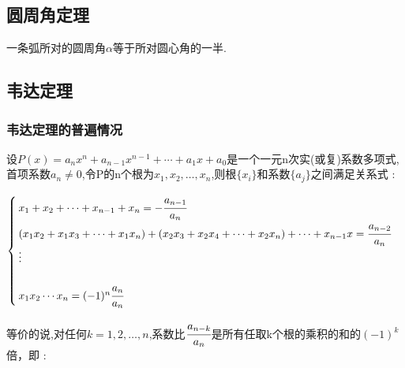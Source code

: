 {\subsection{圆周角定理}{
    一条弧所对的圆周角$\alpha$等于所对圆心角的一半.


}%

\subsection{韦达定理}{
\subsubsection{韦达定理的普遍情况}{
设$P(x) = a_nx^n + a_{n-1}x^{n-1} + \dotsm + a_1x + a_0$是一个一元n次实(或复)系数多项式,首项系数$a_n \neq 0$,令P的n个根为$x_1,x_2,\dots,x_n$,则根$\{x_i\}$和系数$\{a_j\}$之间满足关系式 :

$$
    \begin{cases}
        x_1 + x_2 + \dotsm + x_{n-1} + x_n = -\cfrac{a_{n-1}}{a_n}                                                           \\
        (x_1x_2 + x_1x_3 + \dotsm + x_1x_n) + (x_2x_3 + x_2x_4 + \dotsm + x_2x_n) + \dotsm + x_{n-1}x = \cfrac{a_{n-2}}{a_n} \\
        \vdots                                                                                                               \\                                                                                                               \\
        x_1x_2 \dotsm x_n = (-1)^n\cfrac{a_n}{a_n}
    \end{cases}
$$

等价的说,对任何$k = 1,2,\dots,n$,系数比$\cfrac{a_{n-k}}{a_n}$是所有任取k个根的乘积的和的$(-1)^k$倍，即 :

}}}
